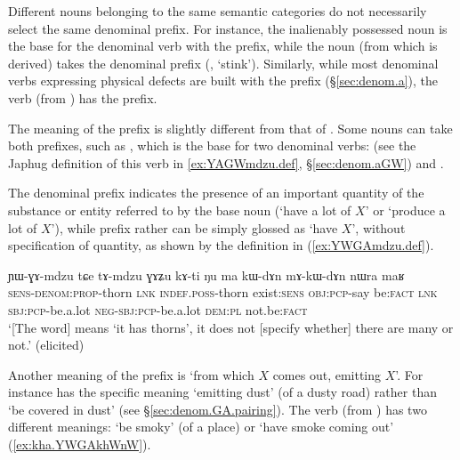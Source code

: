 Different nouns belonging to the same semantic categories do not necessarily select the same denominal prefix. For instance, the inalienably possessed noun  is the base for the denominal verb  with the  prefix, while the noun  (from which  is derived) takes the  denominal prefix (, `stink'). Similarly, while most denominal verbs expressing physical defects are built with the  prefix (§\ref{sec:denom.a}), the verb  (from ) has the  prefix.

The meaning of the  prefix is slightly different from that of . Some nouns can take both prefixes, such as , which is the base for two denominal verbs:  (see the Japhug definition of this verb in \ref{ex:YAGWmdzu.def}, §\ref{sec:denom.aGW}) and . 

The  denominal prefix indicates the presence of an important quantity of the substance or entity referred to by the base noun (`have a lot of $X$' or `produce a lot of $X$'), while  prefix rather can be simply glossed as `have $X$', without specification of quantity, as shown by the definition in (\ref{ex:YWGAmdzu.def}).

\begin{exe}
\ex \label{ex:YWGAmdzu.def}
 \gll ɲɯ-ɣɤ-mdzu tɕe tɤ-mdzu ɣɤʑu kɤ-ti ŋu ma kɯ-dɤn mɤ-kɯ-dɤn nɯra maʁ\\
 \textsc{sens}-\textsc{denom}:\textsc{prop}-thorn \textsc{lnk} \textsc{indef}.\textsc{poss}-thorn exist:\textsc{sens} \textsc{obj}:\textsc{pcp}-say be:\textsc{fact}  \textsc{lnk} \textsc{sbj}:\textsc{pcp}-be.a.lot \textsc{neg}-\textsc{sbj}:\textsc{pcp}-be.a.lot \textsc{dem}:\textsc{pl} not.be:\textsc{fact}\\
 \glt `[The word]  means `it has thorns', it does not [specify whether] there are many or not.' (elicited)
\end{exe}

Another meaning of the  prefix is `from which $X$ comes out, emitting $X$'. For instance  has the specific meaning `emitting dust' (of a dusty road) rather than `be covered in dust' (see §\ref{sec:denom.GA.pairing}). The verb  (from ) has two different meanings: `be smoky' (of a place) or `have smoke coming out' (\ref{ex:kha.YWGAkhWnW}). 


